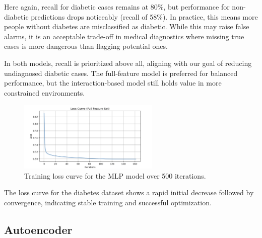 \noindent
Here again, recall for diabetic cases remains at 80\%, but performance for non-diabetic predictions drops noticeably (recall of 58\%). In practice, this means more people without diabetes are misclassified as diabetic. While this may raise false alarms, it is an acceptable trade-off in medical diagnostics where missing true cases is more dangerous than flagging potential ones.

\vspace{1em}
\noindent
In both models, recall is prioritized above all, aligning with our goal of reducing undiagnosed diabetic cases. The full-feature model is preferred for balanced performance, but the interaction-based model still holds value in more constrained environments.

\begin{figure}[H]
    \centering
    \includegraphics[width=0.6\textwidth]{images/mlp-loss-curve.png} 
    \caption{Training loss curve for the MLP model over 500 iterations.}
    \label{fig:mlp_loss_curve}
    \end{figure}

The loss curve for the diabetes dataset shows a rapid initial decrease followed by convergence, indicating stable training and successful optimization.


\subsection{Autoencoder}


